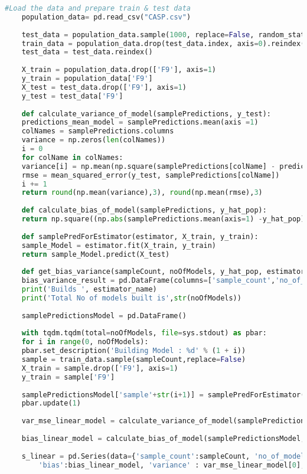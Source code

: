 \documentclass[a4paper]{article}
\begin{document}
\begin{appendices}
\begin{lstlisting}[language=Python]
	#Load the data and prepare train & test data
	population_data= pd.read_csv("CASP.csv")
	
	test_data = population_data.sample(1000, replace=False, random_state=100) #300
	train_data = population_data.drop(test_data.index, axis=0).reindex()
	test_data = test_data.reindex()
	
	X_train = population_data.drop(['F9'], axis=1)
	y_train = population_data['F9']
	X_test = test_data.drop(['F9'], axis=1)
	y_test = test_data['F9']
	
	def calculate_variance_of_model(samplePredictions, y_test):
	predictions_mean_model = samplePredictions.mean(axis =1)
	colNames = samplePredictions.columns
	variance = np.zeros(len(colNames))
	i = 0
	for colName in colNames:
	variance[i] = np.mean(np.square(samplePredictions[colName] - predictions_mean_model))
	rmse = mean_squared_error(y_test, samplePredictions[colName])
	i += 1
	return round(np.mean(variance),3), round(np.mean(rmse),3)
	
	def calculate_bias_of_model(samplePredictions, y_hat_pop):
	return np.square((np.abs(samplePredictions.mean(axis=1) -y_hat_pop).mean()))
	
	def samplePredForEstimator(estimator, X_train, y_train):
	sample_Model = estimator.fit(X_train, y_train)
	return sample_Model.predict(X_test)
	
	def get_bias_variance(sampleCount, noOfModels, y_hat_pop, estimator_name, estimator):
	bias_variance_result = pd.DataFrame(columns=['sample_count','no_of_models','algorithm','bias','variance', 'mse'])
	print('Builds ', estimator_name)
	print('Total No of models built is',str(noOfModels))
	
	samplePredictionsModel = pd.DataFrame()
	
	with tqdm.tqdm(total=noOfModels, file=sys.stdout) as pbar:
	for i in range(0, noOfModels):
	pbar.set_description('Building Model : %d' % (1 + i))
	sample = train_data.sample(sampleCount,replace=False)
	X_train = sample.drop(['F9'], axis=1)
	y_train = sample['F9']
	
	samplePredictionsModel['sample'+str(i+1)] = samplePredForEstimator(estimator, X_train, y_train)
	pbar.update(1)
	
	var_mse_linear_model = calculate_variance_of_model(samplePredictionsModel, y_test)
	
	bias_linear_model = calculate_bias_of_model(samplePredictionsModel, y_hat_pop)
	
	s_linear = pd.Series(data={'sample_count':sampleCount, 'no_of_models':noOfModels, 'algorithm':'LR',
		'bias':bias_linear_model, 'variance' : var_mse_linear_model[0], 'mse' : var_mse_linear_model[1]}, name = 0)
	

\end{lstlisting}
\end{appendices}
\end{document}
